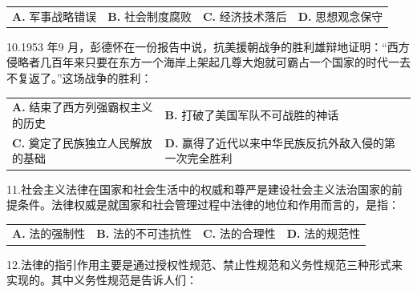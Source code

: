 \documentclass[UTF8,11pt]{ctexart}
\begin{document}
\begin{center}\begin{tabular}{>{\raggedright\arraybackslash}p{\dimexpr(\linewidth-8\tabcolsep)/4\relax}>{\raggedright\arraybackslash}p{\dimexpr(\linewidth-8\tabcolsep)/4\relax}>{\raggedright\arraybackslash}p{\dimexpr(\linewidth-8\tabcolsep)/4\relax}>{\raggedright\arraybackslash}p{\dimexpr(\linewidth-8\tabcolsep)/4\relax}}
\textbf{A.} 军事战略错误 & \textbf{B.} 社会制度腐败 & \textbf{C.} 经济技术落后 & \textbf{D.} 思想观念保守\\[.35em]\end{tabular}\end{center}

10.1953 年9 月，彭德怀在一份报告中说，抗美援朝战争的胜利雄辩地证明：“西方侵略者几百年来只要在东方一个海岸上架起几尊大炮就可霸占一个国家的时代一去不复返了。”这场战争的胜利：


\begin{center}\begin{tabular}{>{\raggedright\arraybackslash}p{\dimexpr(\linewidth-4\tabcolsep)/2\relax}>{\raggedright\arraybackslash}p{\dimexpr(\linewidth-4\tabcolsep)/2\relax}}
\textbf{A.} 结束了西方列强霸权主义的历史 & \textbf{B.} 打破了美国军队不可战胜的神话\\[.35em]
\textbf{C.} 奠定了民族独立人民解放的基础 & \textbf{D.} 赢得了近代以来中华民族反抗外敌入侵的第一次完全胜利\\[.35em]\end{tabular}\end{center}

11.社会主义法律在国家和社会生活中的权威和尊严是建设社会主义法治国家的前提条件。法律权威是就国家和社会管理过程中法律的地位和作用而言的，是指：


\begin{center}\begin{tabular}{>{\raggedright\arraybackslash}p{\dimexpr(\linewidth-8\tabcolsep)/4\relax}>{\raggedright\arraybackslash}p{\dimexpr(\linewidth-8\tabcolsep)/4\relax}>{\raggedright\arraybackslash}p{\dimexpr(\linewidth-8\tabcolsep)/4\relax}>{\raggedright\arraybackslash}p{\dimexpr(\linewidth-8\tabcolsep)/4\relax}}
\textbf{A.} 法的强制性 & \textbf{B.} 法的不可违抗性 & \textbf{C.} 法的合理性 & \textbf{D.} 法的规范性\\[.35em]\end{tabular}\end{center}

12.法律的指引作用主要是通过授权性规范、禁止性规范和义务性规范三种形式来实现的。其中义务性规范是告诉人们：
\end{document}
